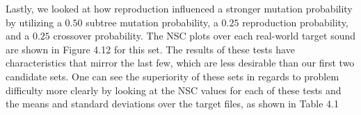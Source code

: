 \documentclass[a4paper,12pt]{report} 	%
\numberwithin{figure}{chapter}
\numberwithin{table}{chapter}
\numberwithin{equation}{chapter}
\begin{document}
\begin{flushleft}
Lastly, we looked at how reproduction influenced a stronger mutation probability by utilizing a $0.50$ subtree mutation probability, a $0.25$ reproduction probability, and a $0.25$ crossover probability. The NSC plots over each real-world target sound are shown in Figure 4.12 for this set.
The results of these tests have characteristics that mirror the last few, which are less desirable than our first two candidate sets. One can see the superiority of these sets in regards to problem difficulty more clearly by looking at the NSC values for each of these tests and the means and standard deviations over the target files, as shown in Table 4.1

\end{flushleft}
\end{document}
